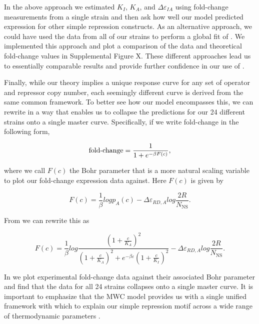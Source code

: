 In the above approach we estimated $K_I$, $K_A$, and $\Delta\varepsilon_{IA}$
using fold-change measurements from a single strain and then ask how well our
model predicted expression for other simple repression constructs. As an
alternative approach, we could have used the data from all of our strains to
perform a global fit of \eref[eq7]. We implemented this approach and plot a
comparison of the data and theoretical fold-change values in Supplemental Figure
X. These different approaches lead us to essentially comparable results and
provide further confidence in our use of \eref[eq7].

 Finally, while our theory implies a unique
response curve for any set of operator and repressor copy number, each seemingly
different curve is derived from the same common framework. To
better see how our model encompasses this, we can rewrite \eref[eq7] in a way
that enables us to collapse the predictions for our 24 different strains onto a
single master curve. Specifically, if we write fold-change in the following
form,

\begin{equation}\label{eq8}
\operatorname{fold-change}= \frac{1}{1+e^{-\beta F(c)}} ,
\end{equation}

\noindent where we call $F(c)$ the Bohr parameter \cite{Phillips2016} that is a more natural scaling variable to plot our fold-change expression data against. Here $F(c)$ is given by 


\begin{equation}\label{eq9}
F(c) =  \frac{1}{\beta} log p_A(c)
- \Delta\varepsilon_{RD,A}
log \frac{2R}{N_{\text{NS}}} .
\end{equation}

From \eref[eq6v2] we can rewrite this as

\begin{equation}\label{eq10}
F(c) = \frac{1}{\beta} log \frac{\left(1+\frac{c}{K_A}\right)^2}{\left(1+\frac{c}{K_A}\right)^2+e^{-\beta  \varepsilon }\left(1+\frac{c}{K_I}\right)^2} - \Delta\varepsilon_{RD,A} log \frac{2R}{N_{\text{NS}}} .
\end{equation}

In  we plot experimental fold-change data against their
associated Bohr parameter and find that the data for all 24 strains collapses onto a single master curve. It is important to emphasize that the MWC model provides us with a
single unified framework with which to explain our simple repression motif
across a wide range of thermodynamic parameters .

